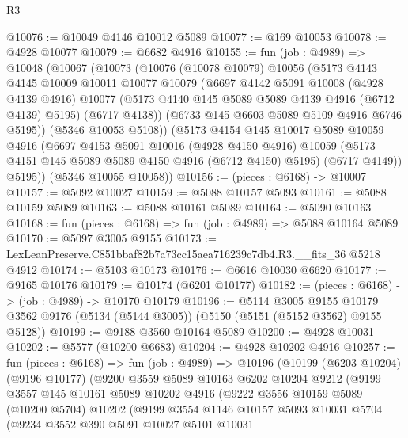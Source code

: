 \begin{lexlean}{R3}
\begin{coremodule}
@10076 := @10049 @4146 @10012 @5089
@10077 := @169 @10053
@10078 := @4928 @10077
@10079 := @6682 @4916
@10155 := fun (job : @4989) =>
  @10048
    (@10067
      (@10073
        (@10076
          (@10078 @10079)
          @10056
          (@5173
            @4143
            @4145
            @10009
            @10011
            @10077
            @10079
            (@6697
              @4142
              @5091
              @10008
              (@4928 @4139 @4916)
              @10077
              (@5173 @4140 @145 @5089 @5089 @4139 @4916 (@6712 @4139) @5195)
              (@6717 @4138))
            (@6733 @145 @6603 @5089 @5109 @4916 @6746 @5195))
          (@5346 @10053 @5108))
        (@5173
          @4154
          @145
          @10017
          @5089
          @10059
          @4916
          (@6697
            @4153
            @5091
            @10016
            (@4928 @4150 @4916)
            @10059
            (@5173 @4151 @145 @5089 @5089 @4150 @4916 (@6712 @4150) @5195)
            (@6717 @4149))
          @5195))
      (@5346 @10055 @10058))
@10156 := (pieces : @6168) -> @10007
@10157 := @5092 @10027
@10159 := @5088 @10157 @5093
@10161 := @5088 @10159 @5089
@10163 := @5088 @10161 @5089
@10164 := @5090 @10163
@10168 := fun (pieces : @6168) => fun (job : @4989) => @5088 @10164 @5089
@10170 := @5097 @3005 @9155
@10173 := LexLeanPreserve.C851bbaf82b7a73cc15aea716239c7db4.R3.__fits_36 @5218 @4912
@10174 := @5103 @10173
@10176 := @6616 @10030 @6620
@10177 := @9165 @10176
@10179 := @10174 (@6201 @10177)
@10182 := (pieces : @6168) -> (job : @4989) -> @10170 @10179
@10196 := @5114
    @3005
    @9155
    @10179
    @3562
    @9176
    (@5134 (@5144 @3005))
    (@5150 (@5151 (@5152 @3562) @9155 @5128))
@10199 := @9188 @3560 @10164 @5089
@10200 := @4928 @10031
@10202 := @5577 (@10200 @6683)
@10204 := @4928 @10202 @4916
@10257 := fun (pieces : @6168) =>
  fun (job : @4989) =>
  @10196
    (@10199
      (@6203 @10204)
      (@9196 @10177)
      (@9200
        @3559
        @5089
        @10163
        @6202
        @10204
        @9212
        (@9199
          @3557
          @145
          @10161
          @5089
          @10202
          @4916
          (@9222
            @3556
            @10159
            @5089
            (@10200 @5704)
            @10202
            (@9199
              @3554
              @1146
              @10157
              @5093
              @10031
              @5704
              (@9234
                @3552
                @390
                @5091
                @10027
                @5101
                @10031

\end{coremodule}
\end{lexlean}
